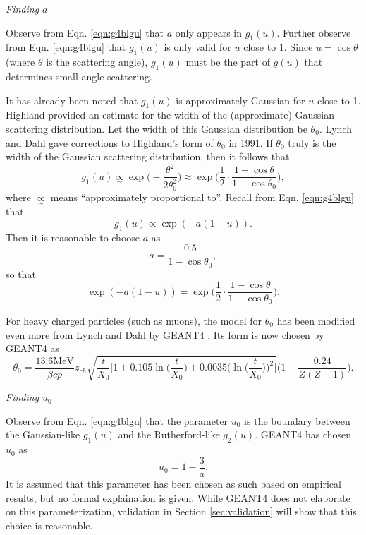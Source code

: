 \noindent \textit{\large{Finding $a$}}

Observe from Eqn. \ref{eqn:g4blgu} that $a$ only appears in $g_1(u)$. Further observe from Eqn. \ref{eqn:g4blgu} that $g_1(u)$ is only valid for $u$ close to 1. Since $u=\cos\theta$ (where $\theta$ is the scattering angle), $g_1(u)$ must be the part of $g(u)$ that determines small angle scattering. 

It has already been noted that $g_1(u)$ is approximately Gaussian for $u$ close to 1. Highland \cite{highland} provided an estimate for the width of the (approximate) Gaussian scattering distribution. Let the width of this Gaussian distribution be $\theta_0$. Lynch and Dahl \cite{lynchdahl} gave corrections to Highland's form of $\theta_0$ in 1991. If $\theta_0$ truly is the width of the Gaussian scattering distribution, then it follows that
%
\begin{equation}\nonumber
g_1(u) \underset{\sim}{\propto} \exp{\Big(-\frac{\theta^2}{2\theta_0^2}\Big)} \approx \exp\Big(\frac{1}{2}\cdot\frac{1-\cos\theta}{1-\cos\theta_0}\Big),
\end{equation}
%
where $\underset{\sim}{\propto}$ means ``approximately proportional to''. Recall from Eqn. \ref{eqn:g4blgu} that
\begin{equation}\nonumber
g_1(u)\propto \exp{(-a(1-u))}.
\end{equation}
Then it is reasonable to choose $a$ as
%
\begin{equation}
a=\frac{0.5}{1-\cos\theta_0},
\label{eqn:geanta}
\end{equation}
%
so that
%
\begin{equation}\nonumber
\exp{(-a(1-u))}=\exp\Big(\frac{1}{2}\cdot\frac{1-\cos\theta}{1-\cos\theta_0}\Big).
\end{equation}
%

 For heavy charged particles (such as muons), the model for $\theta_0$ has been modified even more from Lynch and Dahl by GEANT4 \cite{geant4}. Its form is now chosen by GEANT4 \cite{geant4} as
%
\begin{equation}\label{g4bltheta0}
\theta_0=\frac{13.6 \text{MeV}}{\beta c p}z_{ch}\sqrt{\frac{t}{X_0}\Big[ 1+0.105\ln\Big(\frac{t}{X_0}\Big)+0.0035\Big(\ln\Big(\frac{t}{X_0}\Big)\Big)^2 \Big]}\Big(1-\frac{0.24}{Z(Z+1)}\Big).
\end{equation}

\noindent \textit{\large{Finding $u_0$}}

Observe from Eqn. \ref{eqn:g4blgu} that the parameter $u_0$ is the boundary between the Gaussian-like $g_1(u)$ and the Rutherford-like $g_2(u)$. GEANT4 \cite{geant4} has chosen $u_0$ as
\begin{equation}
u_0=1-\frac{3}{a}.
\label{eqn:geantu0}
\end{equation}
It is assumed that this parameter has been chosen as such based on empirical results, but no formal explaination is given. While GEANT4 \cite{geant4} does not elaborate on this parameterization, validation in Section \ref{sec:validation} will show that this choice is reasonable.

